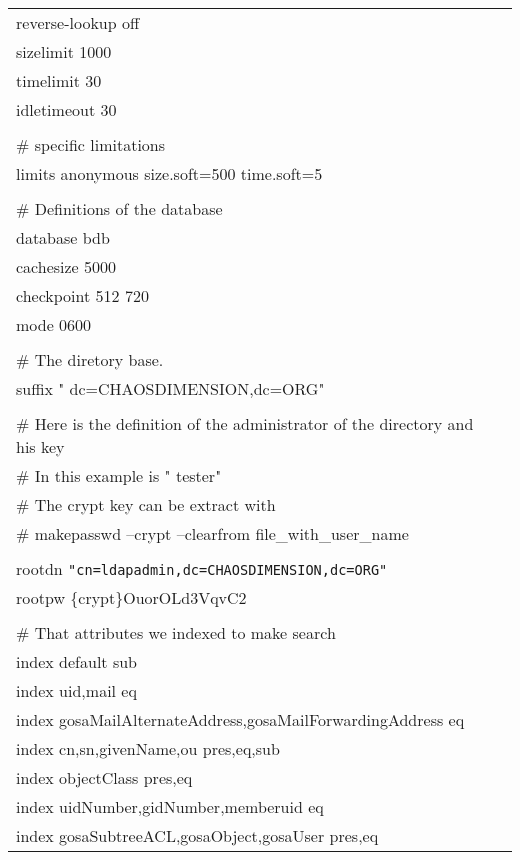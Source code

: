 \begin{center}
\begin{longtable}{|ll|}
reverse-lookup off & \\
sizelimit 1000 & \\
timelimit 30 & \\
idletimeout 30 & \\
 & \\
\# specific limitations & \\
limits anonymous    size.soft=500 time.soft=5 & \\
 & \\
\# Definitions of the database & \\
database        bdb & \\
cachesize       5000 & \\
checkpoint	512 720 & \\
mode		0600 & \\
 & \\
\# The diretory base. & \\
suffix          " dc=CHAOSDIMENSION,dc=ORG"  & \\
 & \\
\# Here is the definition of the administrator of the directory and his key & \\
\# In this example is " tester"  & \\
\# The crypt key can be extract with  & \\
\# makepasswd --crypt --clearfrom file\_with\_user\_name & \\
 & \\
rootdn  \verb|"cn=ldapadmin,dc=CHAOSDIMENSION,dc=ORG"|  & \\
rootpw  \{crypt\}OuorOLd3VqvC2 & \\
 & \\
\# That attributes we indexed to make search & \\
index   default                                                sub & \\
index   uid,mail                                               eq & \\
index   gosaMailAlternateAddress,gosaMailForwardingAddress     eq & \\
index   cn,sn,givenName,ou                                     pres,eq,sub & \\
index   objectClass                                            pres,eq & \\
index   uidNumber,gidNumber,memberuid                          eq & \\
index   gosaSubtreeACL,gosaObject,gosaUser                     pres,eq & \\

\end{longtable}
\end{center}
